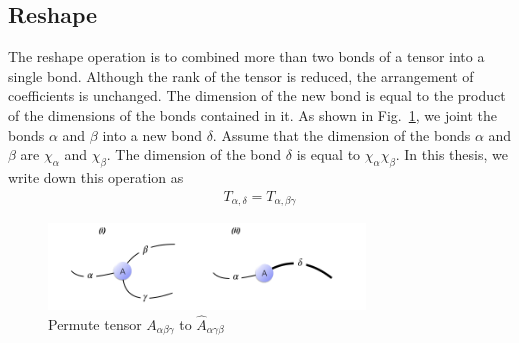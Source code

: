\subsection{Reshape}
\label{reshape}
The reshape operation is to combined more than two bonds of a tensor into a single bond. Although the rank of the tensor is reduced, the arrangement of coefficients is unchanged. The dimension of the new bond is equal to the product of the dimensions of the bonds contained in it. As shown in Fig.~\ref{figreshape}, we joint the bonds $\alpha$ and $\beta$ into a new bond $\delta$. Assume that the dimension of the bonds $\alpha$ and $\beta$ are $\chi_{\alpha}$ and $\chi_{\beta}$. The dimension of the bond $\delta$ is equal to $\chi_{\alpha}\chi_{\beta}$. In this thesis, we write down this operation as\begin{align}
	T_{\alpha, \delta} = T_{\alpha, \beta \gamma}
\end{align}

\begin{figure}[H]
	\centering
	\includegraphics[width=0.75\textwidth]{figures/figreshape.png}
	\caption[The permutation of a tensor.]{ Permute tensor $A_{\alpha \beta \gamma}$ to $\hat{A}_{\alpha \gamma \beta}$ }
	\label{figreshape}
\end{figure} 


%


